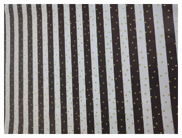 \begin{figure}[h!t]
\begin{subfigure}[b]{0.25\textwidth}
    \end{subfigure}%
    \begin{subfigure}[b]{0.25\textwidth}
        \centering
        \includegraphics[width=0.9\linewidth]{images/materials/giftpaper-cam}
    \end{subfigure}%


\end{figure}

